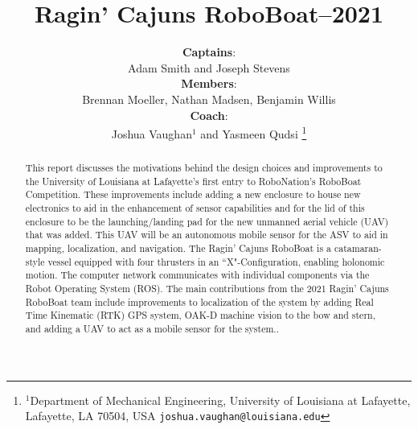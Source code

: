 \documentclass[letterpaper, 12 pt, conference]{ieeeconf}
\title{\LARGE \bf Ragin' Cajuns RoboBoat--2021}
\author{\textbf{Captains}:\\Adam Smith and Joseph Stevens \\
\textbf{Members}:\\Brennan Moeller, Nathan Madsen, Benjamin Willis\\
\textbf{Coach}:\\Joshua Vaughan$^{1}$ and Yasmeen Qudsi%
\thanks{$^{1}$Department of Mechanical Engineering,
        University of Louisiana at Lafayette, Lafayette, LA 70504, USA
        {\tt\small joshua.vaughan@louisiana.edu}}%
}
\begin{document}
\maketitle
\thispagestyle{fancyplain}
\begin{abstract}
This report discusses the motivations behind the design choices and improvements to the University of Louisiana at Lafayette's first entry to RoboNation's RoboBoat Competition. These improvements include adding a new enclosure to house new electronics to aid in the enhancement of sensor capabilities and for the lid of this enclosure to be the launching/landing pad for the new unmanned aerial vehicle (UAV) that was added. This UAV will be an autonomous mobile sensor for the ASV to aid in mapping, localization, and navigation. The Ragin' Cajuns RoboBoat is a catamaran-style vessel equipped with four thrusters in an ``X"-Configuration, enabling holonomic motion. The computer network communicates with individual components via the Robot Operating System (ROS). The main contributions from the 2021 Ragin' Cajuns RoboBoat team include improvements to localization of the system  by adding Real Time Kinematic (RTK) GPS system, OAK-D machine vision to the bow and stern, and adding a UAV to act as a mobile sensor for the system..
\end{abstract}
\end{document}
